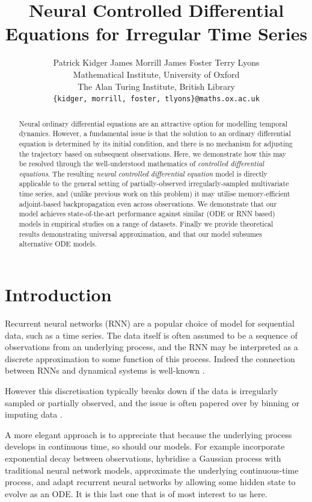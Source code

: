 \documentclass{article}
\title{Neural Controlled Differential Equations for Irregular Time Series}
\author{Patrick Kidger \qquad James Morrill \qquad James Foster \qquad Terry Lyons\\[2pt]
	Mathematical Institute, University of Oxford \\
	The Alan Turing Institute, British Library \\
	\texttt{\{kidger, morrill, foster, tlyons\}@\hspace{0.8pt}maths.ox.ac.uk}}
\theoremstyle{plain}
\theoremstyle{definition}
\begin{document}
	\maketitle
	\begin{abstract}
		Neural ordinary differential equations are an attractive option for modelling temporal dynamics. However, a fundamental issue is that the solution to an ordinary differential equation is determined by its initial condition, and there is no mechanism for adjusting the trajectory based on subsequent observations. Here, we demonstrate how this may be resolved through the well-understood mathematics of \emph{controlled differential equations}. The resulting \emph{neural controlled differential equation} model is directly applicable to the general setting of partially-observed irregularly-sampled multivariate time series, and (unlike previous work on this problem) it may utilise memory-efficient adjoint-based backpropagation even across observations. We demonstrate that our model achieves state-of-the-art performance against similar (ODE or RNN based) models in empirical studies on a range of datasets. Finally we provide theoretical results demonstrating universal approximation, and that our model subsumes alternative ODE models.
	\end{abstract}
	\section{Introduction}
	Recurrent neural networks (RNN) are a popular choice of model for sequential data, such as a time series. The data itself is often assumed to be a sequence of observations from an underlying process, and the RNN may be interpreted as a discrete approximation to some function of this process. Indeed the connection between RNNs and dynamical systems is well-known \cite{FUNAHASHI1993801, rnn-dynamical, E2017, nais-net}.
	
	However this discretisation typically breaks down if the data is irregularly sampled or partially observed, and the issue is often papered over by binning or imputing data \cite{gelman2007dataanalysis}.
	
	A more elegant approach is to appreciate that because the underlying process develops in continuous time, so should our models. For example \cite{Che2018, BRITS, NeuralHawkes, discreteevent} incorporate exponential decay between observations, \cite{gp-adapter1, gp-adapter2} hybridise a Gaussian process with traditional neural network models, \cite{interpolation-prediction} approximate the underlying continuous-time process, and \cite{latent-odes, gru-ode-bayes} adapt recurrent neural networks by allowing some hidden state to evolve as an ODE. It is this last one that is of most interest to us here.
	
\end{document}

